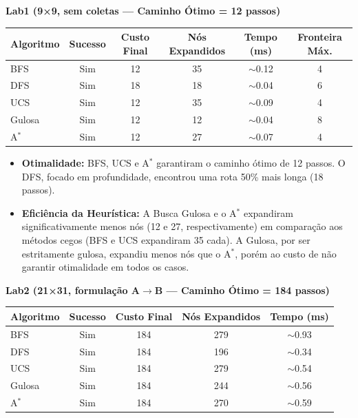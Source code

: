 \documentclass[12pt,a4paper]{article}
\begin{document}
\textbf{Lab1 (9×9, sem coletas — Caminho Ótimo = 12 passos)}
\begin{table}[H]
\centering
\begin{tabular}{lccccc}
\toprule
\textbf{Algoritmo} & \textbf{Sucesso} & \textbf{Custo Final} & \textbf{Nós Expandidos} & \textbf{Tempo (ms)} & \textbf{Fronteira Máx.} \\
\midrule
BFS    & Sim & 12 & 35 & $\sim$0.12 & 4 \\
DFS    & Sim & 18 & 18 & $\sim$0.04 & 6 \\
UCS    & Sim & 12 & 35 & $\sim$0.09 & 4 \\
Gulosa & Sim & 12 & 12 & $\sim$0.04 & 8 \\
A$^*$  & Sim & 12 & 27 & $\sim$0.07 & 4 \\
\bottomrule
\end{tabular}
\end{table}

\begin{itemize}
    \item \textbf{Otimalidade:} BFS, UCS e A$^*$ garantiram o caminho ótimo de 12 passos. O DFS, focado em profundidade, encontrou uma rota 50\% mais longa (18 passos).
    \item \textbf{Eficiência da Heurística:} A Busca Gulosa e o A$^*$ expandiram significativamente menos nós (12 e 27, respectivamente) em comparação aos métodos cegos (BFS e UCS expandiram 35 cada). A Gulosa, por ser estritamente gulosa, expandiu menos nós que o A$^*$, porém ao custo de não garantir otimalidade em todos os casos.
\end{itemize}

\textbf{Lab2 (21×31, formulação A$\rightarrow$B — Caminho Ótimo = 184 passos)}
\begin{table}[H]
\centering
\begin{tabular}{lcccc}
\toprule
\textbf{Algoritmo} & \textbf{Sucesso} & \textbf{Custo Final} & \textbf{Nós Expandidos} & \textbf{Tempo (ms)} \\
\midrule
BFS    & Sim & 184 & 279 & $\sim$0.93 \\
DFS    & Sim & 184 & 196 & $\sim$0.34 \\
UCS    & Sim & 184 & 279 & $\sim$0.54 \\
Gulosa & Sim & 184 & 244 & $\sim$0.56 \\
A$^*$  & Sim & 184 & 270 & $\sim$0.59 \\
\bottomrule
\end{tabular}
\end{table}
\end{document}

